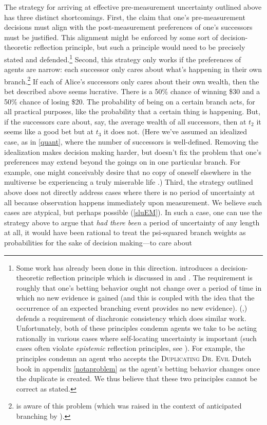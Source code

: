 \documentclass[12pt,onecolumn,secnumarabic,amsmath,amssymb,balancelastpage,nofootinbib]{article}
\begin{document}
The strategy for arriving at effective pre-measurement uncertainty outlined above has three distinct shortcomings.  First, the claim that one's pre-measurement decisions must align with the post-measurement preferences of one's successors must be justified.  This alignment might be enforced by some sort of decision-theoretic reflection principle, but such a principle would need to be precisely stated and defended.\footnote{Some work has already been done in this direction.  \citet[]{wallace2002} introduces a decision-theoretic reflection principle which is discussed in \citet[]{greaves2004} and \citet[.1]{greaves2007b}.  The requirement is roughly that one's betting behavior ought not change over a period of time in which no new evidence is gained (and this is coupled with the idea that the occurrence of an expected branching event provides no new evidence).  \citeauthor{wallace2010b} (\citeyear{wallace2010b},\citeyear{wallace2012}) defends a requirement of diachronic consistency which does similar work.  Unfortunately, both of these principles condemn agents we take to be acting rationally in various cases where self-locating uncertainty is important (such cases often violate \emph{epistemic} reflection principles, see \citealp{lewis2009, arntzenius2003}).  For example, the principles condemn an agent who accepts the \textsc{Duplicating Dr. Evil} Dutch book in appendix \ref{notaproblem} as the agent's betting behavior changes once the duplicate is created.  We thus believe that these two principles cannot be correct as stated.}  Second, this strategy only works if the preferences of agents are narrow: each successor only cares about what's happening in their own branch.\footnote{\citet{tappenden2011} is aware of this problem (which was raised in the context of anticipated branching by \citealp{price2010}).}  If each of Alice's successors only cares about their own wealth, then the bet described above seems lucrative.  There is a 50\% chance of winning \$30 and a 50\% chance of losing \$20.  The probability of being on a certain branch acts, for all practical purposes, like the probability that a certain thing is happening.  But, if the successors care about, say, the average wealth of all successors, then at $t_2$ it seems like a good bet but at $t_3$ it does not.  (Here we've assumed an idealized case, as in \textsection \ref{quant}, where the number of successors is well-defined.  Removing the idealization makes decision making harder, but doesn't fix the problem that one's preferences may extend beyond the goings on in one particular branch.  For example, one might conceivably desire that no copy of oneself elsewhere in the multiverse be experiencing a truly miserable life \citep[]{price2010}.)  Third, the strategy outlined above does not directly address cases where there is no period of uncertainty at all because observation happens immediately upon measurement. We believe such cases are atypical, but perhaps possible (\textsection \ref{sluEM}).  In such a case, one can use the strategy above to argue that \emph{had there been} a period of uncertainty of any length at all, it would have been rational to treat the psi-squared branch weights as probabilities for the sake of decision making---to care about 
\end{document}
